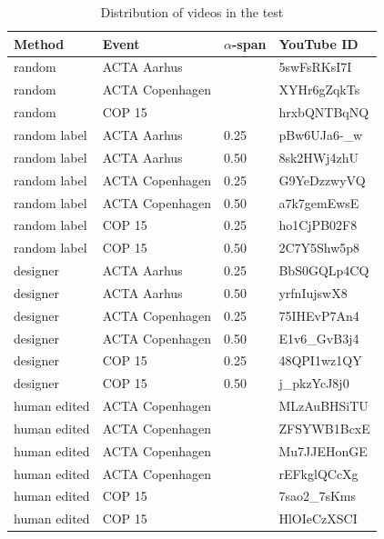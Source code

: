\begin{table}\centering
    \begin{tabular}{|l|l|l|l|}
        \hline
        Method       & Event           & $\alpha$-span & YouTube ID \\ \hline
        random       & ACTA Aarhus     & ~             & 5swFsRKsI7I \\ %
        random       & ACTA Copenhagen & ~             & XYHr6gZqkTs \\ %
        random       & COP 15          & ~             & hrxbQNTBqNQ \\ %
        random label & ACTA Aarhus     & 0.25          & pBw6UJa6-\_w \\ %
        random label & ACTA Aarhus     & 0.50          & 8sk2HWj4zhU \\ %
        random label & ACTA Copenhagen & 0.25          & G9YeDzzwyVQ \\ %
        random label & ACTA Copenhagen & 0.50          & a7k7gemEwsE \\ %
        random label & COP 15          & 0.25          & ho1CjPB02F8 \\ %
        random label & COP 15          & 0.50          & 2C7Y5Shw5p8 \\ %
        designer     & ACTA Aarhus     & 0.25          & BbS0GQLp4CQ \\ %
        designer     & ACTA Aarhus     & 0.50          & yrfnIujswX8 \\ %
        designer     & ACTA Copenhagen & 0.25          & 75IHEvP7An4 \\ %
        designer     & ACTA Copenhagen & 0.50          & E1v6\_GvB3j4 \\ %
        designer     & COP 15          & 0.25          & 48QPI1wz1QY \\ %
        designer     & COP 15          & 0.50          & j\_pkzYcJ8j0 \\ %
        human edited & ACTA Copenhagen & ~             & MLzAuBHSiTU \\ 
        human edited & ACTA Copenhagen & ~             & ZFSYWB1BcxE \\ 
        human edited & ACTA Copenhagen & ~             & Mu7JJEHonGE \\ 
        human edited & ACTA Copenhagen & ~             & rEFkglQCcXg \\ 
        human edited & COP 15          & ~             & 7sao2\_7sKms \\ 
        human edited & COP 15          & ~             & HlOIeCzXSCI \\
        \hline
    \end{tabular}
\caption{Distribution of videos in the test}\label{tab:videosintest}
\end{table}
%
